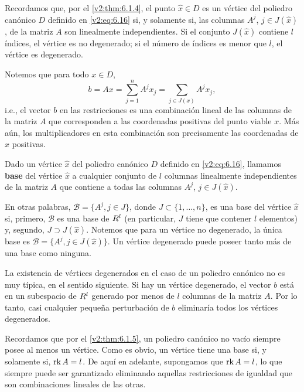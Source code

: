 Recordamos que, por el \cref{v2:thm:6.1.4}, el punto $\hat{x} \in D$ es un vértice del poliedro canónico $D$ definido en \eqref{v2:eq:6.16} si, y solamente si, las columnas $A^j$, $j \in J(\hat{x})$, de la matriz $A$ son linealmente independientes. Si el conjunto $J(\hat{x})$ contiene $l$ índices, el vértice es no degenerado; si el número de índices es menor que $l$, el vértice es degenerado.

Notemos que para todo $x \in D$,
\[
    b = Ax = \sum_{j=1}^n A^j x_j = \sum_{j \in J(x)} A^j x_j,
\]
i.e., el vector $b$ en las restricciones es una combinación lineal de las columnas de la matriz $A$ que corresponden a las coordenadas positivas del punto viable $x$. Más aún, los multiplicadores en esta combinación son precisamente las coordenadas de $x$ positivas.

\begin{definition}\label{v2:def:6.1.2}
    Dado un vértice $\hat{x}$ del poliedro canónico $D$ definido en \eqref{v2:eq:6.16}, llamamos \textbf{base} del vértice $\hat{x}$ a cualquier conjunto de $l$ columnas linealmente independientes de la matriz $A$ que contiene a todas las columnas $A^j$, $j \in J(\hat{x})$.
\end{definition}

En otras palabras, $\mathcal{B} = \{ A^j, j \in J \}$, donde $J \subset \{1, \dots, n\}$, es una base del vértice $\hat{x}$ si, primero, $\mathcal{B}$ es una base de $R^l$ (en particular, $J$ tiene que contener $l$ elementos) y, segundo, $J \supset J(\hat{x})$. Notemos que para un vértice no degenerado, la única base es $\mathcal{B} = \{ A^j, j \in J(\hat{x}) \}$. Un vértice degenerado puede poseer tanto más de una base como ninguna.

La existencia de vértices degenerados en el caso de un poliedro canónico no es muy típica, en el sentido siguiente. Si hay un vértice degenerado, el vector $b$ está en un subespacio de $R^l$ generado por menos de $l$ columnas de la matriz $A$. Por lo tanto, casi cualquier pequeña perturbación de $b$ eliminaría todos los vértices degenerados.

Recordamos que por el \cref{v2:thm:6.1.5}, un poliedro canónico no vacío siempre posee al menos un vértice. Como es obvio, un vértice tiene una base si, y solamente si, $\operatorname{rk} A = l$. De aquí en adelante, supongamos que $\operatorname{rk} A = l$, lo que siempre puede ser garantizado eliminando aquellas restricciones de igualdad que son combinaciones lineales de las otras.

